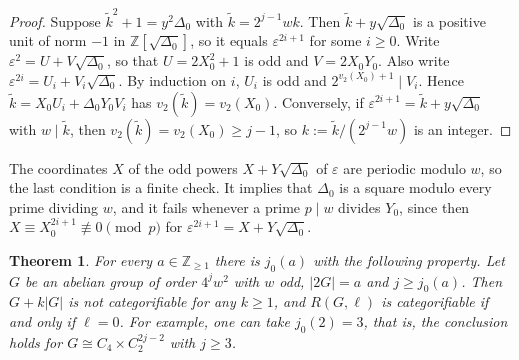 \documentclass[10pt]{article}
\theoremstyle{plain}
\newtheorem{theorem}{Theorem}[section]
\theoremstyle{definition}
\theoremstyle{plain}
\begin{document}
\begin{proof}
Suppose $\tilde k^2+1=y^2\Delta_0$ with $\tilde k=2^{j-1}wk$. Then $\tilde k+y\sqrt{\Delta_0}$ is a positive unit of norm $-1$ in $\mathbb{Z}[\sqrt{\Delta_0}]$, so it equals $\varepsilon^{2i+1}$ for some $i\geq0$. Write $\varepsilon^2=U+V\sqrt{\Delta_0}$, so that $U=2X_0^2+1$ is odd and $V=2X_0Y_0$. Also write $\varepsilon^{2i}=U_i+V_i\sqrt{\Delta_0}$. By induction on $i$, $U_i$ is odd and $2^{v_2(X_0)+1}\mid V_i$. Hence $\tilde k=X_0U_i+\Delta_0Y_0V_i$ has $v_2(\tilde k)=v_2(X_0)$. Conversely, if $\varepsilon^{2i+1}=\tilde k+y\sqrt{\Delta_0}$ with $w\mid \tilde k$, then $v_2(\tilde k)=v_2(X_0)\geq j-1$, so $k:=\tilde k/(2^{j-1}w)$ is an integer.
\end{proof}

The coordinates $X$ of the odd powers $X+Y\sqrt{\Delta_0}$ of $\varepsilon$ are periodic modulo $w$, so the last condition is a finite check. It implies that $\Delta_0$ is a square modulo every prime dividing $w$, and it fails whenever a prime $p\mid w$ divides $Y_0$, since then $X\equiv X_0^{2i+1}\not\equiv0\pmod p$ for $\varepsilon^{2i+1}=X+Y\sqrt{\Delta_0}$.

\begin{theorem}\label{thm:2groups}
For every $a\in\mathbb{Z}_{\geq1}$ there is $j_0(a)$ with the following property. Let $G$ be an abelian group of order $4^jw^2$ with $w$ odd, $|2G|=a$ and $j\geq j_0(a)$. Then $G+k|G|$ is not categorifiable for any $k\geq1$, and $R(G,\ell)$ is categorifiable if and only if $\ell=0$. For example, one can take $j_0(2)=3$, that is, the conclusion holds for $G\cong C_4\times C_2^{2j-2}$ with $j\geq3$.
\end{theorem}
\end{document}
